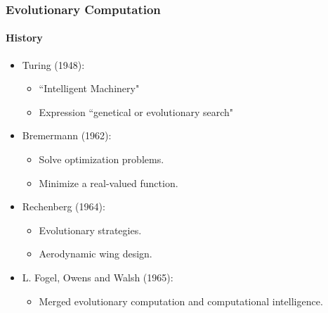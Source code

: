 \frame
{
	\frametitle{Evolutionary Computation}
	\framesubtitle{History}

	
	\begin{itemize}
		\item Turing (1948):
			\begin{itemize}
				\item ``Intelligent Machinery"
				\item Expression ``genetical or evolutionary search"
			\end{itemize}
		\item Bremermann (1962):
			\begin{itemize}
				\item Solve optimization problems.
				\item Minimize a real-valued function.
			\end{itemize}
		\item Rechenberg (1964):
			\begin{itemize}
				\item Evolutionary strategies.
				\item Aerodynamic wing design.
			\end{itemize}
		\item L. Fogel, Owens and Walsh (1965):
			\begin{itemize}
				\item Merged evolutionary computation and computational intelligence.
			\end{itemize}
	\end{itemize}	
}

